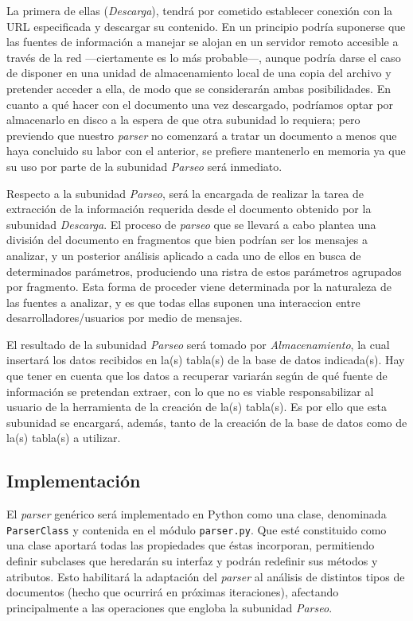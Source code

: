 La primera de ellas (\textit{Descarga}), tendrá por cometido establecer
conexión con la URL especificada y descargar su contenido. En un principio
podría suponerse que las fuentes de información a manejar se alojan en un
servidor remoto accesible a través de la red ---ciertamente es lo más probable---,
aunque podría darse el caso de disponer en una unidad de almacenamiento local
de una copia del archivo y pretender acceder a ella, de modo que se considerarán
ambas posibilidades. En cuanto a qué hacer con el documento una vez descargado,
podríamos optar por almacenarlo en disco a la espera de que otra subunidad lo
requiera; pero previendo que nuestro \textit{parser} no comenzará a tratar un
documento a menos que haya concluido su labor con el anterior, se prefiere
mantenerlo en memoria ya que su uso por parte de la subunidad \textit{Parseo}
será inmediato.

Respecto a la subunidad \textit{Parseo}, será la encargada de realizar la tarea
de extracción de la información requerida desde el documento obtenido por la
subunidad \textit{Descarga}. El proceso de \textit{parseo} que se llevará
a cabo plantea una división del documento en fragmentos que bien podrían ser
los mensajes a analizar, y un posterior análisis aplicado a cada uno de ellos
en busca de determinados parámetros, produciendo una ristra de estos parámetros
agrupados por fragmento. Esta forma de proceder viene determinada por la
naturaleza de las fuentes a analizar, y es que todas ellas suponen
una interaccion entre desarrolladores/usuarios por medio de mensajes.

El resultado de la subunidad \textit{Parseo} será tomado por \textit{Almacenamiento},
la cual insertará los datos recibidos en la(s) tabla(s) de la base de datos
indicada(s). Hay que tener en cuenta que los datos a recuperar variarán según
de qué fuente de información se pretendan extraer, con lo que no es viable
responsabilizar al usuario de la herramienta de la creación de la(s) tabla(s).
Es por ello que esta subunidad se encargará, además, tanto de la creación de
la base de datos como de la(s) tabla(s) a utilizar.


\subsection{Implementación}
El \textit{parser} genérico será implementado en Python como una clase,
denominada \texttt{Parser\-Class} y contenida en el módulo \texttt{parser.py}.
Que esté constituido como una clase aportará todas las propiedades que éstas
incorporan, permitiendo definir subclases que heredarán su interfaz y podrán
redefinir sus métodos y atributos. Esto habilitará la adaptación del \textit{parser}
al análisis de distintos tipos de documentos (hecho que ocurrirá en
próximas iteraciones), afectando principalmente a las operaciones que engloba
la subunidad \textit{Parseo}.

